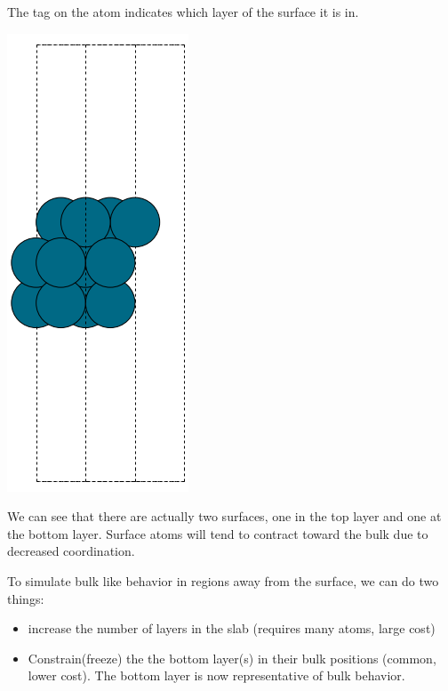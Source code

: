 \documentclass[11pt]{article}
\begin{document}
The tag on the atom indicates which layer of the surface it is in.

\includegraphics[width=205bp]{./images/Pd-slab.png}

We can see that there are actually two surfaces, one in the top layer and one at the bottom layer. Surface atoms will tend to contract toward the bulk due to decreased coordination. 

To simulate bulk like behavior in regions away from the surface, we can do two things:

\begin{itemize}
\item increase the number of layers in the slab (requires many atoms, large cost)

\item Constrain(freeze) the the bottom layer(s) in their bulk positions (common, lower cost). The bottom layer is now representative of bulk behavior.
\end{itemize}
\end{document}
